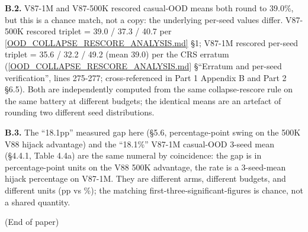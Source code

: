 \documentclass[11pt]{article}
\begin{document}
\textbf{B.2.} V87-1M and V87-500K rescored casual-OOD means both round to 39.0\%, but this is a chance match, not a copy: the underlying per-seed values differ. V87-500K rescored triplet = 39.0 / 37.3 / 40.7 per \href{https://github.com/llaa33219/MicroMixer-4/blob/4bb630413dfa58ef3141291e121ab8c006d03235/OOD_COLLAPSE_RESCORE_ANALYSIS.md}{[OOD\_COLLAPSE\_RESCORE\_ANALYSIS.md]} \S1; V87-1M rescored per-seed triplet = 35.6 / 32.2 / 49.2 (mean 39.0) per the CRS erratum (\href{https://github.com/llaa33219/MicroMixer-4/blob/4bb630413dfa58ef3141291e121ab8c006d03235/OOD_COLLAPSE_RESCORE_ANALYSIS.md}{[OOD\_COLLAPSE\_RESCORE\_ANALYSIS.md]} \S``Erratum and per-seed verification'', lines 275-277; cross-referenced in Part 1 Appendix B and Part 2 \S6.5). Both are independently computed from the same collapse-rescore rule on the same battery at different budgets; the identical means are an artefact of rounding two different seed distributions.

\textbf{B.3.} The ``18.1pp'' measured gap here (\S5.6, percentage-point swing on the 500K V88 hijack advantage) and the ``18.1\%'' V87-1M casual-OOD 3-seed mean (\S4.4.1, Table 4.4a) are the same numeral by coincidence: the gap is in percentage-point units on the V88 500K advantage, the rate is a 3-seed-mean hijack percentage on V87-1M. They are different arms, different budgets, and different units (pp vs \%); the matching first-three-significant-figures is chance, not a shared quantity.

(End of paper)
\end{document}
